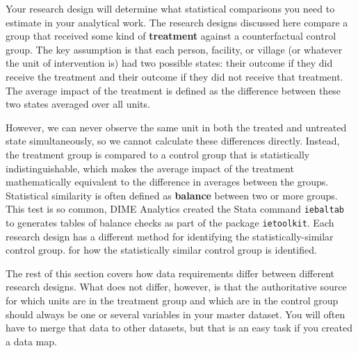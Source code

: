 Your research design will determine what statistical comparisons you need
to estimate in your analytical work.
The research designs discussed here compare a group that received
some kind of \textbf{treatment}
against a counterfactual control group.
The key assumption is that each
person, facility, or village (or whatever the unit of intervention is)
had two possible states: their outcome if they did receive the treatment
and their outcome if they did not receive that treatment.
The average impact of the treatment is defined as
the difference between these two states averaged over all units.

However, we can never observe the same unit
in both the treated and untreated state simultaneously,
so we cannot calculate these differences directly.
Instead, the treatment group is compared to a control group
that is statistically indistinguishable,
which makes the average impact of the treatment
mathematically equivalent to the difference in averages between the groups.
Statistical similarity is often defined
as \textbf{balance} between two or more groups.	
This test is so common,	
DIME Analytics created the Stata command \texttt{iebaltab}	
to generates tables of balance checks	
as part of the package \texttt{ietoolkit}.	
Each research design has a different method	for identifying the statistically-similar control group. 
for how the statistically similar control group is identified.

The rest of this section covers how data requirements differ
between different research designs.
What does not differ, however, is that the authoritative source
for which units are in the treatment group and which are in the control group
should always be one or several variables in your master dataset. 
You will often have to merge that data to other datasets, 
but that is an easy task if you created a data map.


